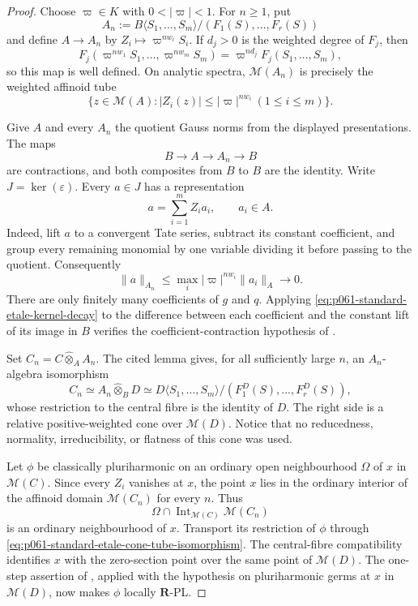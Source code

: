 \begin{proof}
Choose \(\varpi\in K\) with \(0<|\varpi|<1\).  For \(n\geq1\), put
\[
 A_n:=B\langle S_1,\ldots,S_m\rangle/
             (F_1(S),\ldots,F_r(S))
\]
and define \(A\to A_n\) by
\(Z_i\mapsto\varpi^{nw_i}S_i\).  If \(d_j>0\) is the weighted degree of
\(F_j\), then
\[
 F_j(\varpi^{nw_1}S_1,\ldots,\varpi^{nw_m}S_m)
       =\varpi^{nd_j}F_j(S_1,\ldots,S_m),
\]
so this map is well defined.  On analytic spectra, \(\mathcal M(A_n)\)
is precisely the weighted affinoid tube
\[
 \{z\in\mathcal M(A): |Z_i(z)|\leq|\varpi|^{nw_i}\ (1\leq i\leq m)\}.
 \tag{\(\clubsuit\)}\label{eq:p061-standard-etale-weighted-tube}
\]

Give \(A\) and every \(A_n\) the quotient Gauss norms from the displayed
presentations.  The maps
\[
                  B\longrightarrow A\longrightarrow A_n\longrightarrow B
\]
are contractions, and both composites from \(B\) to \(B\) are the
identity.  Write \(J=\ker(\varepsilon)\).  Every \(a\in J\) has a
representation
\[
                            a=\sum_{i=1}^m Z_i a_i,
                 \qquad a_i\in A.
 \tag{\(\spadesuit\)}\label{eq:p061-standard-etale-kernel-generation}
\]
Indeed, lift \(a\) to a convergent Tate series, subtract its constant
coefficient, and group every remaining monomial by one variable dividing
it before passing to the quotient.  Consequently
\[
 \|a\|_{A_n}
 \leq\max_i |\varpi|^{nw_i}\|a_i\|_A
 \longrightarrow0.
 \tag{\(\diamondsuit\)}\label{eq:p061-standard-etale-kernel-decay}
\]
There are only finitely many coefficients of \(g\) and \(q\).  Applying
\eqref{eq:p061-standard-etale-kernel-decay} to the difference between each
coefficient and the constant lift of its image in \(B\) verifies the
coefficient-contraction hypothesis of
.

Set \(C_n=C\widehat\otimes_AA_n\).  The cited lemma gives, for all
sufficiently large \(n\), an \(A_n\)-algebra isomorphism
\[
 C_n\simeq A_n\widehat\otimes_BD
      \simeq D\langle S_1,\ldots,S_m\rangle/
                  (F_1^D(S),\ldots,F_r^D(S)),
 \tag{\(*\)}\label{eq:p061-standard-etale-cone-tube-isomorphism}
\]
whose restriction to the central fibre is the identity of \(D\).  The
right side is a relative positive-weighted cone over \(\mathcal M(D)\).
Notice that no reducedness, normality, irreducibility, or flatness of this
cone was used.

Let \(\phi\) be classically pluriharmonic on an ordinary open
neighbourhood \(\Omega\) of \(x\) in \(\mathcal M(C)\).  Since every
\(Z_i\) vanishes at \(x\), the point \(x\) lies in the ordinary interior
of the affinoid domain \(\mathcal M(C_n)\) for every \(n\).  Thus
\[
             \Omega\cap\operatorname{Int}_{\mathcal M(C)}\mathcal M(C_n)
\]
is an ordinary neighbourhood of \(x\).  Transport its restriction of
\(\phi\) through \eqref{eq:p061-standard-etale-cone-tube-isomorphism}.
The central-fibre compatibility identifies \(x\) with the zero-section
point over the same point of \(\mathcal M(D)\).  The one-step assertion of
, applied with the
hypothesis on pluriharmonic germs at \(x\) in \(\mathcal M(D)\), now makes
\(\phi\) locally \(\mathbf R\)-PL.


\end{proof}
